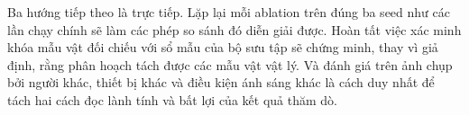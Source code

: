 Ba hướng tiếp theo là trực tiếp. Lặp lại mỗi ablation trên đúng ba seed như các
lần chạy chính sẽ làm các phép so sánh đó diễn giải được. Hoàn tất việc xác
minh khóa mẫu vật đối chiếu với sổ mẫu của bộ sưu tập sẽ chứng minh, thay vì
giả định, rằng phân hoạch tách được các mẫu vật vật lý. Và đánh giá trên ảnh
chụp bởi người khác, thiết bị khác và điều kiện ánh sáng khác là cách duy nhất
để tách hai cách đọc lành tính và bất lợi của kết quả thăm dò.

